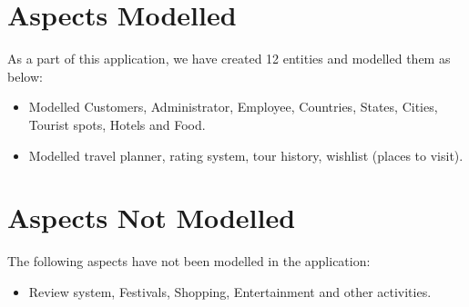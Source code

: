 \documentclass[11pt]{article}
\begin{document}
\section{Aspects Modelled}
As a part of this application, we have created 12 entities and modelled them as below:
\begin{itemize}
\item Modelled Customers, Administrator, Employee, Countries, States, Cities, Tourist spots, Hotels and Food.
\item Modelled travel planner, rating system, tour history, wishlist (places to visit). 
\end{itemize}

\section{Aspects Not Modelled}
The following aspects have not been modelled in the application:
\begin{itemize}
\item Review system, Festivals, Shopping, Entertainment and other activities.
\end{itemize}
\end{document}
